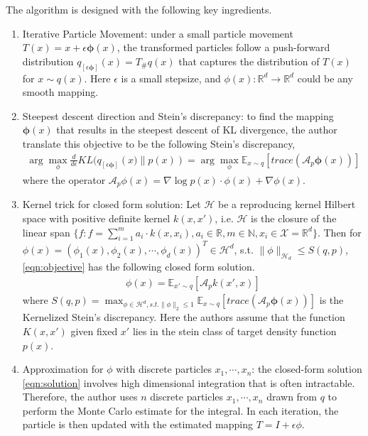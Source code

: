 The algorithm is designed with the following key ingredients.

\begin{enumerate}
    \item Iterative Particle Movement: under a small particle movement $T(x) = x + \epsilon \mathbf{\phi}(x)$, the transformed particles follow a push-forward distribution $q_{[\epsilon\mathbf{\phi}]}(x) = T_{\#}q(x)$ that captures the distribution of $T(x)$ for $x\sim q(x)$. Here $\epsilon$ is a small stepsize, and $\phi(x): \mathbb{R}^d\rightarrow \mathbb{R}^d$ could be any smooth mapping.
    \item Steepest descent direction and Stein's discrepancy: to find the mapping $\mathbf{\phi}(x)$ that results in the steepest descent of KL divergence, the author translate this objective to be the following Stein's discrepancy,
    \begin{align}
    \label{eqn:objective}
         \arg\max_\phi\frac{d}{d \epsilon}KL(q_{[\epsilon\mathbf{\phi}]}\left(x)\lVert p(x)\right) = \arg\max_\phi \mathbb{E}_{x\sim q}\left[trace\left(\mathcal{A}_p \mathbf{\phi}(x)\right)\right]
    \end{align}
    where the operator $\mathcal{A}_p \phi(x)= \nabla \log p(x) \cdot \phi(x) + \nabla\phi(x)$.
    \item Kernel trick for closed form solution: Let $\mathcal{H}$ be a reproducing kernel Hilbert space with positive definite kernel $k(x,x')$, i.e. $\mathcal{H}$ is the closure of the linear span $\{f: f = \sum_{i=1}^m a_i \cdot k(x, x_i), a_i\in \mathbb{R}, m\in \mathbb{N}, x_i\in \mathcal{X}=\mathbb{R}^d \}$. Then for $\phi(x) = \left(\phi_1(x), \phi_2(x), \cdots, \phi_d(x)\right)^T \in \mathcal{H}^d$, s.t. $\lVert\phi\rVert_{\mathcal{H}_d}\leq S(q, p)$, \eqref{eqn:objective}  has the following closed form solution.
    \begin{align}
    \label{eqn:solution}
        \phi(x) = \mathbb{E}_{x'\sim q}\left[ \mathcal{A}_p k(x', x) \right]
    \end{align}
    where $S(q, p) = \max_{\phi\in \mathcal{H}^d, s.t. \lVert\phi\rVert_2\leq 1} \mathbb{E}_{x\sim q}\left[trace\left(\mathcal{A}_p \mathbf{\phi}(x)\right)\right]$ is the Kernelized Stein's discrepancy. Here the authors assume that the function $K(x, x')$ given fixed $x'$ lies in the stein class of target density function $p(x)$.
    \item Approximation for $\phi$ with discrete particles $x_1, \cdots, x_n$: the closed-form solution \eqref{eqn:solution} involves high dimensional integration that is often intractable. Therefore, the author uses $n$ discrete particles $x_1, \cdots, x_n$ drawn from $q$ to perform the Monte Carlo estimate for the integral. In each iteration, the particle is then updated with the estimated mapping $T = I + \epsilon \phi$.
\end{enumerate}

